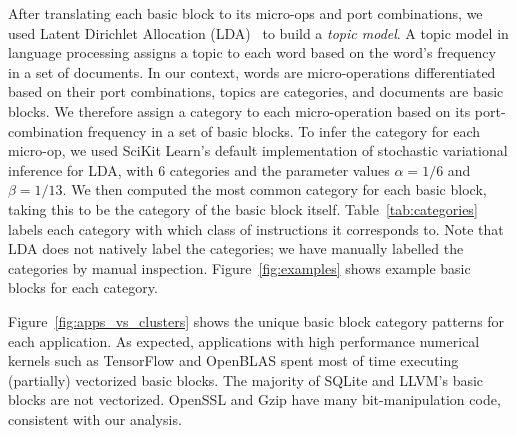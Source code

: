 After translating each basic block to its micro-ops and port combinations, we used Latent Dirichlet Allocation (LDA)~\cite{lda} to build a \emph{topic model}. A topic model in language processing assigns a topic to each word based on the word's frequency in a set of documents. In our context, words are micro-operations differentiated based on their port combinations, topics are categories, and documents are basic blocks. We therefore assign a category to each micro-operation based on its port-combination frequency in a set of basic blocks.
To infer the category for each micro-op, we
used SciKit Learn's default implementation of stochastic variational inference for LDA\cite{lda},
with 6 categories and the parameter values $\alpha = 1/6$ and $\beta = 1/13$. 
We then computed the most common category for each basic block, taking this to be the category of the basic block itself.
Table~\ref{tab:categories} labels each category with which class of instructions it corresponds to.
Note that LDA does not natively label the categories;
we have manually labelled the categories by manual inspection.
Figure~\ref{fig:examples} shows example basic blocks for each category.

Figure~\ref{fig:apps_vs_clusters} shows the unique basic block category patterns for each application.
As expected, applications with high performance numerical kernels such as TensorFlow and
OpenBLAS spent most of time executing (partially) vectorized basic blocks.
The majority of SQLite and LLVM's basic blocks are not vectorized.
OpenSSL and Gzip have many bit-manipulation code, consistent with our analysis.

